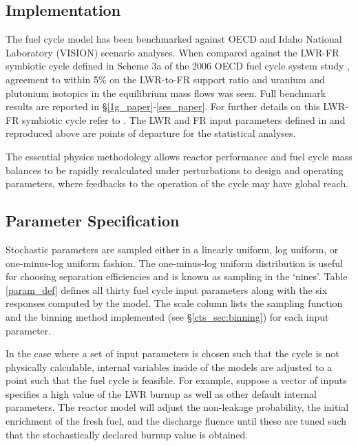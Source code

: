 \subsection{Implementation}
\label{cts_sec:implementation}

The fuel cycle model has been benchmarked against OECD and Idaho National Laboratory
(VISION) scenario analyses. When compared against the LWR-FR symbiotic cycle defined in Scheme
3a of the 2006 OECD fuel cycle system study \cite{NEA-5990}, agreement to within 5\% on the LWR-to-FR support
ratio and uranium and plutonium isotopics in the equilibrium mass flows was seen. Full benchmark
results are reported in \S \ref{1g_paper}-\ref{ses_paper}.  For further details on this LWR-FR
symbiotic cycle refer to \cite{Shropshire2009}. The LWR and FR input parameters defined in
\cite{Shropshire2009} and reproduced above are points of departure for the
statistical analyses.

The essential physics methodology allows reactor performance and fuel cycle mass
balances to be rapidly recalculated under perturbations to design and operating 
parameters, where feedbacks to the operation of the cycle may have global reach.

\subsection{Parameter Specification}
\label{cts_sec:paramspec}

Stochastic parameters are sampled either in a linearly uniform, log uniform, or one-minus-log uniform fashion.
The one-minus-log uniform distribution is useful for choosing separation efficiencies and is known as sampling
in the `nines'.  Table \ref{param_def} defines all thirty fuel cycle input parameters along with the six
responses computed by the model.  The scale column lists the sampling function
and the binning method implemented (see \S \ref{cts_sec:binning}) for each input parameter.



In the case where a set of input parameters is chosen such that the cycle is not physically calculable,
internal variables inside of the models are adjusted to a point such that the fuel cycle is feasible.
For example, suppose a vector of inputs specifies a high value of the LWR burnup as well as other default
internal parameters.  The reactor model will adjust the non-leakage probability, the initial enrichment
of the fresh fuel, and the discharge fluence until these are tuned such that the stochastically 
declared burnup value is obtained.

